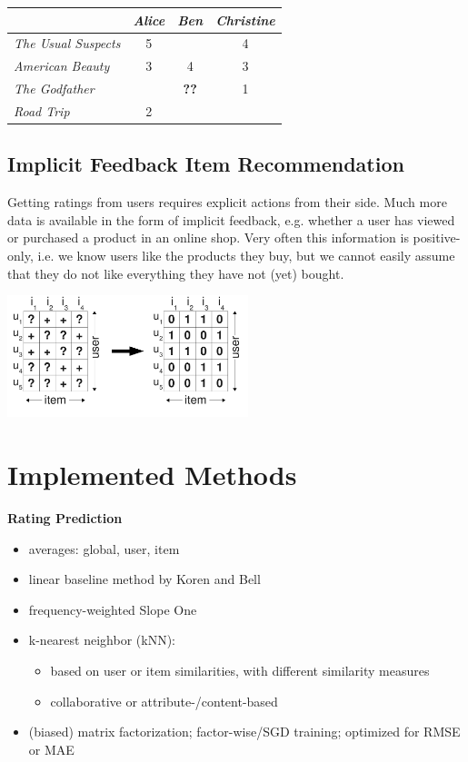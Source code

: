 \documentclass[a4paper, foldmark, 12pt]{leaflet}
\newcommand{\UserI}{\textit{Alice}}
\newcommand{\UserII}{\textit{Ben}}
\newcommand{\UserIII}{\textit{Christine}}
\newcommand{\MovieI}{\textit{The Usual Suspects}}
\newcommand{\MovieII}{\textit{American Beauty}}
\newcommand{\MovieIII}{\textit{The Godfather}}
\newcommand{\MovieIV}{\textit{Road Trip}}
\begin{document}
\begin{center}
      \begin{tabular}{|l||c|c|c|}
        \hline
	           & \UserI & \UserII & \UserIII \\ \hline
	\hline
	\MovieI    &  5   &     & 4     \\ \hline
	\MovieII   &  3   & 4   & 3    \\ \hline
	\MovieIII  &      & \textbf{??}    & 1    \\ \hline
	\MovieIV   &  2   &     &        \\ \hline
      \end{tabular}
\end{center}


\subsection{Implicit Feedback Item Recommendation}

Getting ratings from users requires explicit actions from their side.
Much more data is available in the form of implicit feedback,
e.g. whether a user has viewed or purchased a product in an online shop.
Very often this information is positive-only,
i.e. we know users like the products they buy, but we cannot easily assume
that they do not like everything they have not (yet) bought.

\begin{center}
	\includegraphics[width=7.0cm]{fig/interpretation_single.pdf}
\end{center}

\newpage 

\section{Implemented Methods}
\textbf{Rating Prediction}
\begin{itemize}
	\item averages: global, user, item
	\item linear baseline method by Koren and Bell
        \item frequency-weighted Slope One
	\item k-nearest neighbor (kNN):
		\begin{itemize}
			\item based on user or item similarities, with different similarity measures
			\item collaborative or attribute-/content-based
		\end{itemize}
	\item (biased) matrix factorization; factor-wise/SGD training; optimized for RMSE or MAE
\end{itemize}
\end{document}

